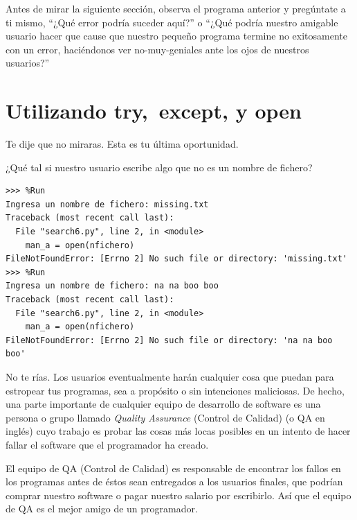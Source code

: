 Antes de mirar la siguiente sección, observa el programa anterior y
pregúntate a ti mismo, ``¿Qué error podría suceder aquí?'' o ``¿Qué
podría nuestro amigable usuario hacer que cause que nuestro pequeño
programa termine no exitosamente con un error, haciéndonos ver
no-muy-geniales ante los ojos de nuestros usuarios?''

\hypertarget{utilizando-try-except-y-open}{%
\section{\texorpdfstring{Utilizando try,\ except, y
open}{Utilizando try, except, y open}}\label{utilizando-try-except-y-open}}

Te dije que no miraras. Esta es tu última oportunidad.

¿Qué tal si nuestro usuario escribe algo que no es un nombre de fichero?

\begin{Verbatim}[frame=single]
>>> %Run
Ingresa un nombre de fichero: missing.txt
Traceback (most recent call last):
  File "search6.py", line 2, in <module>
    man_a = open(nfichero)
FileNotFoundError: [Errno 2] No such file or directory: 'missing.txt'
>>> %Run
Ingresa un nombre de fichero: na na boo boo
Traceback (most recent call last):
  File "search6.py", line 2, in <module>
    man_a = open(nfichero)
FileNotFoundError: [Errno 2] No such file or directory: 'na na boo boo'
\end{Verbatim}

No te rías. Los usuarios eventualmente harán cualquier cosa que puedan
para estropear tus programas, sea a propósito o sin intenciones
maliciosas. De hecho, una parte importante de cualquier equipo de
desarrollo de software es una persona o grupo llamado \emph{Quality
Assurance} (Control de Calidad) (o QA en inglés) cuyo trabajo es probar
las cosas más locas posibles en un intento de hacer fallar el software
que el programador ha creado.

 

El equipo de QA (Control de Calidad) es responsable de encontrar los
fallos en los programas antes de éstos sean entregados a los usuarios
finales, que podrían comprar nuestro software o pagar nuestro salario
por escribirlo. Así que el equipo de QA es el mejor amigo de un
programador.

  
  


